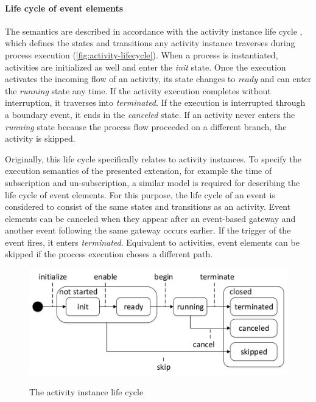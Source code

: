 \paragraph{Life cycle of event elements}
The semantics are described in accordance with the activity instance life cycle \cite[p.\,84]{weske:bpm-book}, which defines the states and transitions any activity instance traverses during process execution (\autoref{fig:activity-lifecycle}).
When a process is instantiated, activities are initialized as well and enter the \textit{init} state.
Once the execution activates the incoming flow of an activity, its state changes to \textit{ready} and can enter the \textit{running} state any time. If the activity execution completes without interruption, it traverses into \textit{terminated}. If the execution is interrupted through a boundary event, it ends in the \textit{canceled} state.
If an activity never enters the \textit{running} state because the process flow proceeded on a different branch, the activity is skipped.

Originally, this life cycle specifically relates to activity instances.
To specify the execution semantics of the presented extension, for example the time of subscription and un-subscription, a similar model is required for describing the life cycle of event elements.
For this purpose, the life cycle of an event is considered to consist of the same states and transitions as an activity.
Event elements can be canceled when they appear after an event-based gateway and another event following the same gateway occurs earlier.
If the trigger of the event fires, it enters \textit{terminated}. Equivalent to activities, event elements can be skipped if the process execution choses a different path.

\begin{figure}[b]
	\myfloatalign
	{\includegraphics[width=1\linewidth]{chapters/concept/bpmnx/activity-lifecycle.png}}
	\caption{The activity instance life cycle}\label{fig:activity-lifecycle}
\end{figure}

